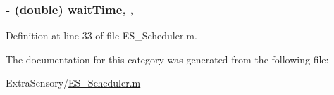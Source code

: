 \hypertarget{category_e_s___scheduler_07_08_a0e5712f2970e9c2bd775c8c9dd83a106}{
\subsubsection[{wait\+Time}]{\setlength{\rightskip}{0pt plus 5cm}-\/ (double) wait\+Time\hspace{0.3cm}{\ttfamily [read]}, {\ttfamily [write]}, {\ttfamily [atomic]}}}\label{category_e_s___scheduler_07_08_a0e5712f2970e9c2bd775c8c9dd83a106}


Definition at line 33 of file E\+S\+\_\+\+Scheduler.\+m.



The documentation for this category was generated from the following file\+:\begin{DoxyCompactItemize}
\item 
Extra\+Sensory/\hyperlink{_e_s___scheduler_8m}{E\+S\+\_\+\+Scheduler.\+m}\end{DoxyCompactItemize}

